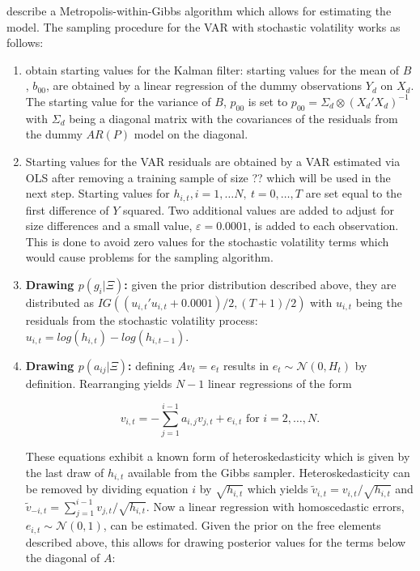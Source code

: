 \documentclass[12pt,letterpaper,fleqn]{article}           %
\begin{document}
\textcite{cogley05} describe a Metropolis-within-Gibbs algorithm which allows for estimating the model. %
The sampling procedure for the VAR with stochastic volatility works as follows:

\begin{enumerate}
\item obtain starting values for the Kalman filter: %
starting values for the mean of $B$, $b_{00}$, are obtained by a linear regression of the dummy observations $Y_d$ on $X_d$. The starting value for the variance of $B$, $p_{00}$ is set to $p_{00} = \Sigma_d \otimes (X_d'X_d)^{-1}$ with $\Sigma_d$ being a diagonal matrix with the covariances of the residuals from the dummy $AR(P)$ model on the diagonal. %
\item Starting values for the VAR residuals are obtained by a VAR estimated via OLS after removing a training sample of size ?? which will be used in the next step. %
Starting values for $h_{i,t}, i = 1,\ldots N,\ t = 0,\ldots, T$ are set equal to the first difference of $Y$ squared. Two additional values are added to adjust for size differences and a small value, $\varepsilon = 0.0001$, is added to each observation. This is done to avoid zero values for the stochastic volatility terms which would cause problems for the sampling algorithm.
\item \textbf{Drawing $p(g_i|\Xi)$:} given the prior distribution described above, they are distributed as $IG((u_{i,t}'u_{i,t} + 0.0001)/2, (T + 1)/2)$ with $u_{i,t}$ being the residuals from the stochastic volatility process: $u_{i,t} = log(h_{i,t}) - log(h_{i,t-1})$.
\item \textbf{Drawing $p(a_{ij}|\Xi)$:} defining  $Av_t = e_t$ results in $e_t \sim \mathcal{N}(0, H_t)$ by definition. Rearranging yields $N - 1$ linear regressions of the form

\begin{equation}
v_{i,t} = - \sum_{j=1}^{i-1} a_{i,j} v_{j,t} + e_{i,t} \mbox{ for } i=2,\ldots,N.
\end{equation}

These equations exhibit a known form of heteroskedasticity which is given by the last draw of $h_{i,t}$ available from the Gibbs sampler. Heteroskedasticity can be removed by dividing equation $i$ by $\sqrt{h_{i,t}}$ which yields $\tilde{v}_{i,t} = v_{i,t} / \sqrt{h_{i,t}}$ and $\tilde{v}_{-i,t} = \sum_{j=1}^{i-1} v_{j,t} / \sqrt{h_{i,t}}$. Now a linear regression with homoscedastic errors, $ e_{i,t} \sim \mathcal{N}(0, 1)$, can be estimated. Given the prior on the free elements described above, this allows for drawing posterior values for the terms below the diagonal of $A$: 


\end{enumerate}
\end{document}
